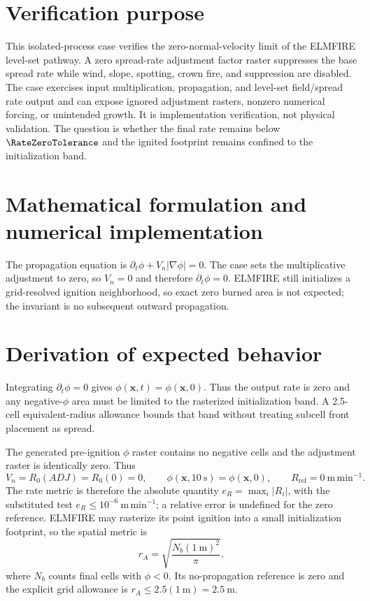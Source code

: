 \section{Verification purpose}

This isolated-process case verifies the zero-normal-velocity limit of the ELMFIRE level-set pathway. A zero spread-rate adjustment factor raster suppresses the base spread rate while wind, slope, spotting, crown fire, and suppression are disabled. The case exercises input multiplication, propagation, and level-set field/spread rate output and can expose ignored adjustment rasters, nonzero numerical forcing, or unintended growth. It is implementation verification, not physical validation. The question is whether the final rate remains below \(\RateZeroTolerance\) and the ignited footprint remains confined to the initialization band.

\section{Mathematical formulation and numerical implementation}

The propagation equation is \(\partial_t\phi+V_n|\nabla\phi|=0\). The case sets the multiplicative adjustment to zero, so \(V_n=0\) and therefore \(\partial_t\phi=0\). ELMFIRE still initializes a grid-resolved ignition neighborhood, so exact zero burned area is not expected; the invariant is no subsequent outward propagation.

\section{Derivation of expected behavior}

Integrating \(\partial_t\phi=0\) gives \(\phi(\mathbf{x},t)=\phi(\mathbf{x},0)\). Thus the output rate is zero and any negative-\(\phi\) area must be limited to the rasterized initialization band. A 2.5-cell equivalent-radius allowance bounds that band without treating subcell front placement as spread.

The generated pre-ignition \(\phi\) raster contains no negative cells and
the adjustment raster is identically zero.  Thus
\[
 V_n=R_0(ADJ)=R_0(0)=0,\qquad
 \phi(\mathbf{x},10~\mathrm{s})=\phi(\mathbf{x},0),
 \qquad R_{\mathrm{ref}}=0~\mathrm{m\,min^{-1}}.
\]
The rate metric is therefore the absolute quantity
\(e_R=\max_i|R_i|\), with the substituted test
\(e_R\leq10^{-6}~\mathrm{m\,min^{-1}}\); a relative error is undefined
for the zero reference.  ELMFIRE may rasterize its point ignition into a
small initialization footprint, so the spatial metric is
\[
 r_A=\sqrt{\frac{N_b(1~\mathrm{m})^2}{\pi}},
\]
where \(N_b\) counts final cells with \(\phi<0\).  Its no-propagation
reference is zero and the explicit grid allowance is
\(r_A\leq2.5(1~\mathrm{m})=2.5~\mathrm{m}\).

